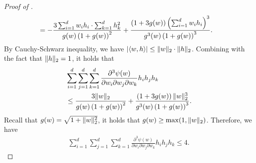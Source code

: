 \begin{proof}[Proof of ]
\begin{align*}
    &= -\frac{3\sum_{i=1}^d w_ih_i\cdot \sum_{k=1}^d h_k^2 }{g(w)\left(1+g(w)\right)^2}+\frac{\left(1+3g(w)\right)\left(\sum_{i=1}^d w_ih_i\right)^3}{g^3(w)\left(1+g(w)\right)^3}.
    \end{align*}
    By Cauchy-Schwarz inequality, we have $\lvert\langle w, h \rangle\rvert\le \lVert w\rVert_2\cdot  \lVert h\rVert_2$. Combining with the fact that $\lVert h\rVert_2=1$,
    it holds that
    \begin{align*}
    &\sum_{i=1}^d\sum^d_{j=1}\sum^d_{k=1}\frac{\partial^3\psi(w)}{\partial w_i\partial w_j\partial w_k}h_ih_jh_k\\ &\le \frac{3 \lVert w\rVert_2 }{g(w)\left(1+g(w)\right)^2}+\frac{\left(1+3g(w)\right){\lVert w\rVert_2^3}}{g^3(w)\left(1+g(w)\right)^3}.
    \end{align*}
    Recall that $g(w)=\sqrt{1+\lVert w\rVert_2^2}$, it holds that $g(w)\ge \max(1,\lVert w\rVert_2)$. Therefore, we have
    \begin{align*}
    \sum_{i=1}^d\sum^d_{j=1}\sum^d_{k=1}\frac{\partial^3\psi(w)}{\partial w_i\partial w_j\partial w_k}h_ih_jh_k\le 4.
    \end{align*}
\end{proof}
